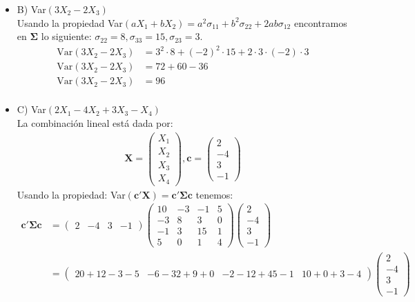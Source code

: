 \begin{sol}
\begin{itemize}
\item B) Var$(3X_2-2X_3)$ \\
Usando la propiedad Var$(aX_1+bX_2)=a^2\sigma_{11}+b^2\sigma_{22}+2ab\sigma_{12}$ encontramos en $\mathbf{\Sigma}$
lo siguiente: $\sigma_{22}=8,\sigma_{33}=15,\sigma_{23}=3$.
\begin{align*}
\text{Var}(3X_2-2X_3) &= 3^2 \cdot 8 + (-2)^2 \cdot 15 + 2 \cdot 3 \cdot (-2) \cdot 3\\
\text{Var}(3X_2-2X_3) &= 72+60-36\\
\text{Var}(3X_2-2X_3) &= 96\\
\end{align*}
\item C) Var$(2X_1-4X_2+3X_3-X_4)$ \\
La combinación lineal está dada por:
\begin{align*}
\mathbf{X}= \begin{pmatrix}
X_1\\X_2\\X_3\\X_4
\end{pmatrix},
\mathbf{c} = \begin{pmatrix}
2\\-4\\3\\-1
\end{pmatrix}
\end{align*}
Usando la propiedad: Var$(\mathbf{c'X})=\mathbf{c' \Sigma c}$ tenemos:
\begin{align*}
\mathbf{c' \Sigma c} &=
\begin{pmatrix}
2 & -4 & 3 & -1 
\end{pmatrix}
\begin{pmatrix}
10&-3&-1&5\\
-3&8&3&0\\
-1&3&15&1\\
5&0&1&4
\end{pmatrix}
\begin{pmatrix}
2 \\ -4 \\ 3 \\ -1 
\end{pmatrix}\\
&= \begin{pmatrix}
20 + 12 -3-5& -6-32+9+0 & -2-12+45-1 & 10+0+3 -4 
\end{pmatrix}
\begin{pmatrix}
2 \\ -4 \\ 3 \\ -1 

\end{pmatrix}
\end{align*}
\end{itemize}
\end{sol}
